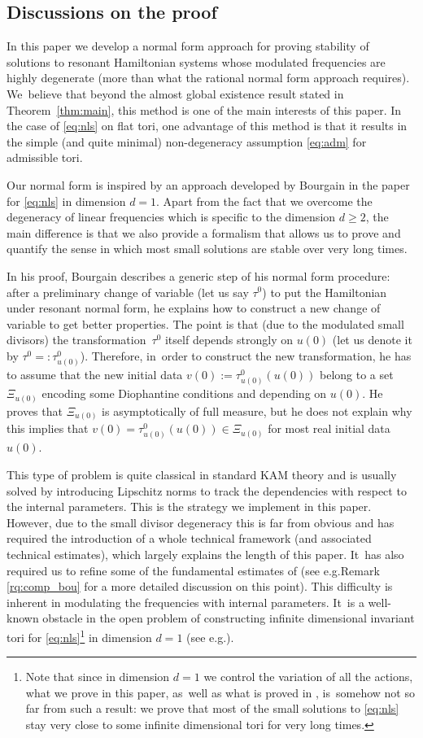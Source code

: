 \documentclass[10pt,a4paper]{amsart}
\providecommand{\eg}{e.g.}
\theoremstyle{plain}
\theoremstyle{definition}
\newcommand{\1}{\mathbf{1}}
\begin{document}
\subsection{Discussions on the proof} In this paper we develop a normal form approach for proving stability of solutions to resonant Hamiltonian systems whose modulated frequencies are highly degenerate (more than what the rational normal form approach requires). We~believe that beyond the almost global existence result stated in Theorem~\ref{thm:main}, this method is one of the main interests of this paper. In the case of \eqref{eq:nls} on flat tori, one advantage of this method is that it results in the simple (and quite minimal) non-degeneracy assumption \eqref{eq:adm} for admissible tori.

Our normal form is inspired by an approach developed by Bourgain in the paper \cite{Bou00} for \eqref{eq:nls} in dimension $d=1$. Apart from the fact that we overcome the degeneracy of linear frequencies which is specific to the dimension $d\geq 2$, the main difference is that we also provide a formalism that allows us to prove and quantify the sense in which most small solutions are stable over very long times.

In his proof, Bourgain describes a generic step of his normal form procedure: after a preliminary change of variable (let us say $\tau^0$) to put the Hamiltonian under resonant normal form, he explains how to construct a new change of variable to get better properties. The point is that (due to the modulated small divisors) the transformation~$\tau^0$ itself depends strongly on $u(0)$ (let us denote it by $\tau^0 =: \tau^0_{u(0)}$). Therefore, in~order to construct the new transformation, he has to assume that the new initial data $v(0):= \tau^0_{u(0)}(u(0))$ belong to a set $\Xi_{u(0)}$ encoding some Diophantine conditions and depending on $u(0)$. He proves that $\Xi_{u(0)}$ is asymptotically of full measure, but he does not explain why this implies that $v(0)=\tau^0_{u(0)}(u(0))\in \Xi_{u(0)}$ for most real initial data $u(0)$.

This type of problem is quite classical in standard KAM theory and is usually solved by introducing Lipschitz norms to track the dependencies with respect to the internal parameters. This is the strategy we implement in this paper. However, due to the small divisor degeneracy this is far from obvious and has required the introduction of a whole technical framework (and associated technical estimates), which largely explains the length of this paper. It~has also required us to refine some of the fundamental estimates of \cite{Bou00} (see \eg Remark \ref{rq:comp_bou} for a more detailed discussion on this point). This difficulty is inherent in modulating the frequencies with internal parameters. It~is a well-known obstacle in the open problem of constructing infinite dimensional invariant tori for \eqref{eq:nls}\footnote{Note that since in dimension $d=1$ we control the variation of all the actions, what we prove in this paper, as~well as what is proved in \cite{Bou00,KillBill}, is~somehow not so far from such a result: we prove that most of the small solutions to \eqref{eq:nls} stay very close to some infinite dimensional tori for very long times.} in dimension $d=1$ (see \eg \cite{Pos}).
\end{document}
